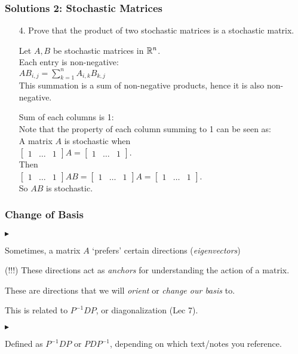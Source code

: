 \documentclass{beamer}
\renewenvironment{itemize}
\renewenvironment{enumerate}%
{\begin{list}{\arabic{enumi}.}%
      {\setlength{\leftmargin}{2.5em}%
       \setlength{\itemsep}{-\parsep}%
       \setlength{\topsep}{-\parskip}%
       \usecounter{enumi}}%
 }{\end{list}}
\renewenvironment{itemize}%
{\begin{list}{$\blacktriangleright$}%
      {\setlength{\leftmargin}{2.5em}%
       \setlength{\itemsep}{-\parsep}%
       \setlength{\topsep}{-\parskip}%
       \usecounter{enumi}}%
 }{\end{list}}
\begin{document}
\begin{frame}
\frametitle{Solutions 2: Stochastic Matrices}
\begin{enumerate}
\item[4.] Prove that the product of two stochastic matrices is a stochastic matrix.
\begin{solution}
Let $A,B$ be stochastic matrices in $\mathbb{R}^n$. \\
Each entry is non-negative: \\
$AB_{i,j} = \sum_{k=1}^n A_{i,k}B_{k,j}$\\
This summation is a sum of non-negative products, hence it is also non-negative.

Sum of each columns is 1: \\

Note that the property of each column summing to 1 can be seen as: \\
A matrix $A$ is stochastic when \\
$\begin{bmatrix}
1& \hdots &1 \end{bmatrix} A = \begin{bmatrix}
1& \hdots &1 \end{bmatrix}$. 
\\
Then \\
$  
\begin{bmatrix}
1& \hdots &1 \end{bmatrix} AB = \begin{bmatrix}
1& \hdots &1 \end{bmatrix}A = \begin{bmatrix}
1& \hdots &1 \end{bmatrix}$. \\
So $AB$ is stochastic.
\end{solution}
\end{enumerate}
\end{frame}

\begin{frame}
\frametitle{Change of Basis}
\begin{itemize}
\item Sometimes, a  matrix $A$ `prefers' certain directions (\textit{eigenvectors})
\item (!!!) These directions act as \textit{anchors} for understanding the action of a matrix.
\item These are directions that we will \textit{orient} or \textit{change our basis} to.
\item This is related to $P^{-1}DP$, or diagonalization (Lec 7). 
\begin{itemize}
\item Defined as $P^{-1}DP$ or $PDP^{-1}$, depending on which text/notes you reference. 
\end{itemize}
\end{itemize}
\end{frame}
\end{document}
